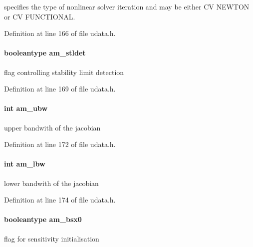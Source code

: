specifies the type of nonlinear solver iteration and may be either C\+V N\+E\+W\+T\+O\+N or C\+V F\+U\+N\+C\+T\+I\+O\+N\+A\+L. 

Definition at line 166 of file udata.\+h.

\hypertarget{struct_user_data_a7d39c238c319f0164a15744950bfd021}{}
\paragraph[{am\+\_\+stldet}]{\setlength{\rightskip}{0pt plus 5cm}booleantype am\+\_\+stldet}\label{struct_user_data_a7d39c238c319f0164a15744950bfd021}
flag controlling stability limit detection 

Definition at line 169 of file udata.\+h.

\hypertarget{struct_user_data_a7283826ef630f92bb04052eb79a377e5}{}
\paragraph[{am\+\_\+ubw}]{\setlength{\rightskip}{0pt plus 5cm}int am\+\_\+ubw}\label{struct_user_data_a7283826ef630f92bb04052eb79a377e5}
upper bandwith of the jacobian 

Definition at line 172 of file udata.\+h.

\hypertarget{struct_user_data_a0fd271dea83e804c7b1ef82a2b0ab76c}{}
\paragraph[{am\+\_\+lbw}]{\setlength{\rightskip}{0pt plus 5cm}int am\+\_\+lbw}\label{struct_user_data_a0fd271dea83e804c7b1ef82a2b0ab76c}
lower bandwith of the jacobian 

Definition at line 174 of file udata.\+h.

\hypertarget{struct_user_data_a87d2f917b1bea7fea2d5878ccd43c7db}{}
\paragraph[{am\+\_\+bsx0}]{\setlength{\rightskip}{0pt plus 5cm}booleantype am\+\_\+bsx0}\label{struct_user_data_a87d2f917b1bea7fea2d5878ccd43c7db}
flag for sensitivity initialisation

